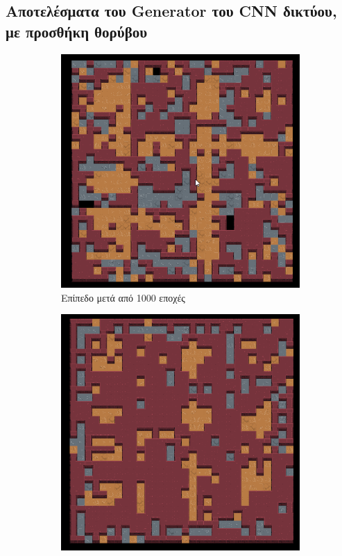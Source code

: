 \subsection{Αποτελέσματα του Generator του CNN δικτύου, με προσθήκη θορύβου}
\begin{figure}[H]
\begin{subfigure}{.5\textwidth}
  \centering
  \includegraphics[width=.8\linewidth]{../images/result_images/cnn-gan-with-fuzzy/generator_1000.png}
  \caption{Επίπεδο μετά από 1000 εποχές}
  \label{fig:sfig1}
\end{subfigure}%
\begin{subfigure}{.5\textwidth}
  \centering
  \includegraphics[width=.8\linewidth]{../images/result_images/cnn-gan-with-fuzzy/generator_3000.png}

\end{subfigure}
\end{figure}
